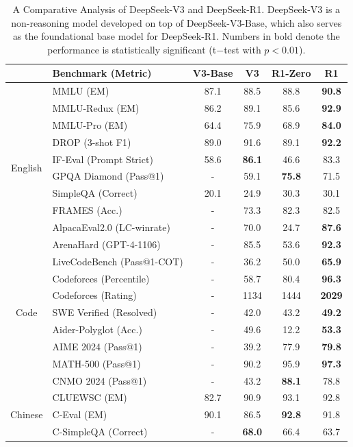 \begin{table}[h]
    \centering
    \small
    \setlength{\tabcolsep}{1.9pt}
    \caption{A Comparative Analysis of DeepSeek-V3 and DeepSeek-R1. DeepSeek-V3 is a non-reasoning model developed on top of DeepSeek-V3-Base, which also serves as the foundational base model for DeepSeek-R1.  Numbers in bold denote the performance is statistically significant  (t$-$test with $p < 0.01$).}
    \begin{tabular}{@{}c l | c c  c  c}
    \toprule
     & \textbf{Benchmark {\tiny (Metric)}} & \textbf{V3-Base} & \textbf{V3} & \textbf{R1-Zero} & \textbf{R1} \\
    \midrule
    \multirow{10}{*}{English}& MMLU {\tiny (EM)} & 87.1 & 88.5 & 88.8 & \textbf{90.8}\\
     & MMLU-Redux {\tiny (EM)} & 86.2 & 89.1 & 85.6 & \textbf{92.9} \\
    & MMLU-Pro {\tiny (EM)}  & 64.4 & 75.9 & 68.9 & \textbf{84.0} \\
    & DROP {\tiny (3-shot F1)}  & 89.0 & 91.6 & 89.1 & \textbf{92.2}\\
    & IF-Eval {\tiny (Prompt Strict)}  & 58.6 & \textbf{86.1} & 46.6 & 83.3 \\
    & GPQA Diamond {\tiny (Pass@1)}  & - & 59.1 & \textbf{75.8} & 71.5 \\
    & SimpleQA {\tiny (Correct)}   & 20.1 & 24.9 & 30.3 & 30.1 \\
     & FRAMES {\tiny (Acc.)}   & - & 73.3 & 82.3 & 82.5\\
      & AlpacaEval2.0 {\tiny (LC-winrate)}  & - & 70.0 & 24.7 & \textbf{87.6}\\
       & ArenaHard {\tiny (GPT-4-1106)}  & - & 85.5 & 53.6 & \textbf{92.3}\\
    \midrule
    \multirow{7}{*}{Code} & LiveCodeBench {\tiny (Pass@1-COT)} & - & 36.2 & 50.0 & \textbf{65.9} \\
    & Codeforces {\tiny (Percentile)} & - & 58.7 & 80.4 & \textbf{96.3} \\
    & Codeforces {\tiny (Rating)} & - & 1134 & 1444 & \textbf{2029} \\
    & SWE Verified {\tiny (Resolved)} & - & 42.0 & 43.2 & \textbf{49.2} \\
    & Aider-Polyglot {\tiny (Acc.)}  & - & 49.6 & 12.2 & \textbf{53.3} \\
    \midrule
    \multirow{3}{*}{Math} & AIME 2024 {\tiny (Pass@1)} & - & 39.2 & 77.9 & \textbf{79.8} \\
    & MATH-500 {\tiny (Pass@1)} & - & 90.2 & 95.9 & \textbf{97.3} \\
    & CNMO 2024 {\tiny (Pass@1)} & - & 43.2 & \textbf{88.1} & 78.8 \\
    \midrule
    \multirow{3}{*}{Chinese} & CLUEWSC {\tiny (EM)} & 82.7 & 90.9 & 93.1 & 92.8\\
    & C-Eval {\tiny (EM)}  & 90.1 & 86.5 & \textbf{92.8} & 91.8\\
     & C-SimpleQA {\tiny (Correct)} & - & \textbf{68.0} & 66.4 & 63.7 \\
    \bottomrule
    \end{tabular}
    \label{tab:v3_full_compare}
\end{table}